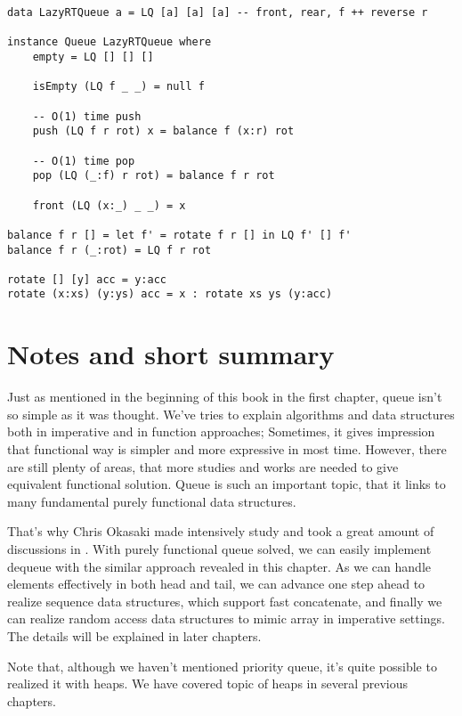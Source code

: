\documentclass{article}
\begin{document}
\lstset{language=Haskell}
\begin{lstlisting}
data LazyRTQueue a = LQ [a] [a] [a] -- front, rear, f ++ reverse r

instance Queue LazyRTQueue where
    empty = LQ [] [] []

    isEmpty (LQ f _ _) = null f

    -- O(1) time push
    push (LQ f r rot) x = balance f (x:r) rot

    -- O(1) time pop
    pop (LQ (_:f) r rot) = balance f r rot

    front (LQ (x:_) _ _) = x

balance f r [] = let f' = rotate f r [] in LQ f' [] f'
balance f r (_:rot) = LQ f r rot

rotate [] [y] acc = y:acc
rotate (x:xs) (y:ys) acc = x : rotate xs ys (y:acc)
\end{lstlisting}

\section{Notes and short summary}
Just as mentioned in the beginning of this book in the first chapter,
queue isn't so simple as it was thought. We've tries to explain
algorithms and data structures both in imperative and in function
approaches; Sometimes, it gives impression that functional way is
simpler and more expressive in most time. However, there are still
plenty of areas, that more studies and works are needed to give equivalent
functional solution. Queue is such an important topic, that it
links to many fundamental purely functional data structures.

That's why Chris Okasaki made intensively study and took a great
amount of discussions in \cite{okasaki-book}. With purely functional
queue solved, we can easily implement dequeue with the similar
approach revealed in this chapter. As we can handle elements effectively
in both head and tail, we can advance one step ahead to realize
sequence data structures, which support fast concatenate, and
finally we can realize random access data structures to mimic
array in imperative settings. The details will be explained
in later chapters.

Note that, although we haven't mentioned priority queue, it's quite
possible to realized it with heaps. We have covered topic of heaps
in several previous chapters.
\end{document}
